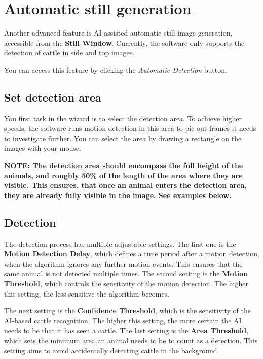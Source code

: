 \documentclass[10pt,a4paper,oneside]{report}             %
\begin{document}
\section{Automatic still generation}

Another advanced feature is AI assisted automatic still image generation, accessible from the \textbf{Still Window}. Currently, the software only supports the detection of cattle in side and top images.

You can access this feature by clicking the \textit{Automatic Detection} button.

\subsection{Set detection area}

You first task in the wizard is to select the detection area. To achieve higher speeds, the software runs motion detection in this area to pic out frames it needs to investigate further. You can select the area by drawing a rectangle on the images with your mouse. 

\textbf{NOTE: The detection area should encompass the full height of the animals, and roughly 50\% of the length of the area where they are visible. This ensures, that once an animal enters the detection area, they are already fully visible in the image. See examples below.}

\subsection{Detection}

The detection process has multiple adjustable settings. The first one is the \textbf{Motion Detection Delay}, which defines a time period after a motion detection, when the algorithm ignores any further motion events. This ensures that the same animal is not detected multiple times. The second setting is the \textbf{Motion Threshold}, which controls the sensitivity of  the motion detection. The higher this setting, the less sensitive the algorithm becomes. 

The next setting is the \textbf{Confidence Threshold}, which is the sensitivity of the AI-based cattle recognition. The higher this setting, the more certain the AI needs to be that it has seen a cattle. The last setting is the \textbf{Area Threshold}, which sets the minimum area an animal needs to be to count as a detection. This setting aims to avoid accidentally detecting cattle in the background.
\end{document}

